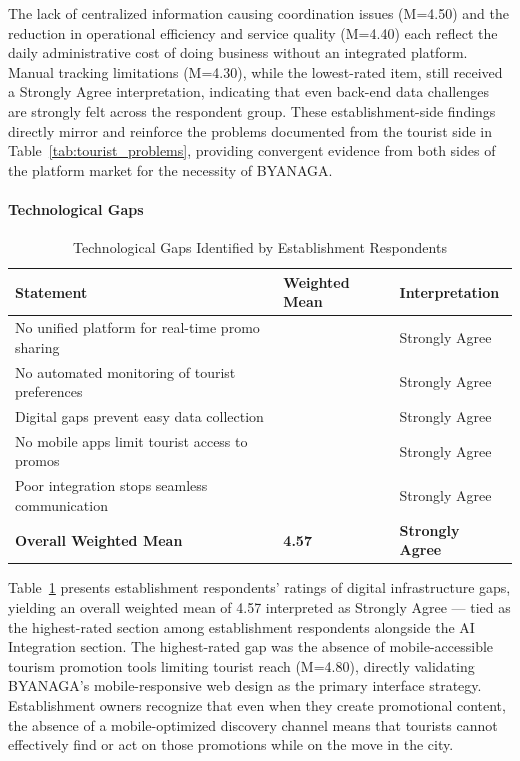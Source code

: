 \documentclass{research}
\begin{document}
The lack of centralized information causing coordination issues (M=4.50) and 
the reduction in operational efficiency and service quality (M=4.40) each 
reflect the daily administrative cost of doing business without an integrated 
platform. Manual tracking limitations (M=4.30), while the lowest-rated item, 
still received a Strongly Agree interpretation, indicating that even back-end 
data challenges are strongly felt across the respondent group. These 
establishment-side findings directly mirror and reinforce the problems 
documented from the tourist side in Table~\ref{tab:tourist_problems}, providing 
convergent evidence from both sides of the platform market for the necessity of 
BYANAGA.

\paragraph{Technological Gaps}

\begin{table}[h]
\centering
\caption{Technological Gaps Identified by Establishment Respondents}
\label{tab:estab_tech_gaps}
\begin{tabularx}{\textwidth}{>{\raggedright\arraybackslash}X>{\centering\arraybackslash}p{2.5cm}>{\centering\arraybackslash}p{3cm}}
\toprule
\textbf{Statement} & \textbf{Weighted Mean} & \textbf{Interpretation} \\
\midrule
No unified platform for real-time promo sharing & 4.63 & Strongly Agree \\
No automated monitoring of tourist preferences & 4.57 & Strongly Agree \\
Digital gaps prevent easy data collection & 4.40 & Strongly Agree \\
No mobile apps limit tourist access to promos & 4.80 & Strongly Agree \\
Poor integration stops seamless communication & 4.47 & Strongly Agree \\
\midrule
\textbf{Overall Weighted Mean} & \textbf{4.57} & \textbf{Strongly Agree} \\
\bottomrule
\end{tabularx}
\end{table}

Table~\ref{tab:estab_tech_gaps} presents establishment respondents' ratings of 
digital infrastructure gaps, yielding an overall weighted mean of 4.57 
interpreted as Strongly Agree --- tied as the highest-rated section among 
establishment respondents alongside the AI Integration section. The highest-rated 
gap was the absence of mobile-accessible tourism promotion tools limiting tourist 
reach (M=4.80), directly validating BYANAGA's mobile-responsive web design as 
the primary interface strategy. Establishment owners recognize that even when 
they create promotional content, the absence of a mobile-optimized discovery 
channel means that tourists cannot effectively find or act on those promotions 
while on the move in the city.
\end{document}
